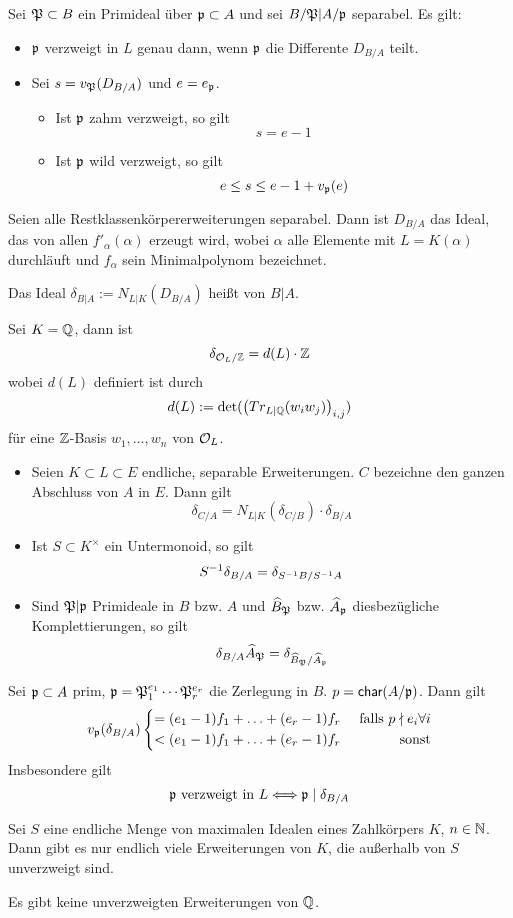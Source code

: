 \Satz{}
Sei $\mathfrak{P} \subset B$ ein Primideal über $\mathfrak{p} \subset A$ und sei $B/\mathfrak{P} | A / \mathfrak{p}$ separabel. Es gilt:
\begin{itemize}
	\item $\mathfrak{p}$ verzweigt in $L$ genau dann, wenn $\mathfrak{p}$ die Differente $D_{B/A}$ teilt.
	\item Sei $s = v_{\mathfrak{P}}(D_{B/A})$ und $e = e_{\mathfrak{p}}$.
	\begin{itemize}
		\item Ist $\mathfrak{p}$ zahm verzweigt, so gilt
		\[ s = e - 1\]
		\item Ist $\mathfrak{p}$ wild verzweigt, so gilt
		\[ e \leq s \leq e - 1 + v_{\mathfrak{p}}(e) \]
	\end{itemize}
\end{itemize}

\Satz{}
Seien alle Restklassenkörpererweiterungen separabel. Dann ist $D_{B/A}$ das Ideal, das von allen $f'_\alpha(\alpha)$ erzeugt wird, wobei $\alpha$ alle Elemente mit $L = K(\alpha)$ durchläuft und $f_\alpha$ sein Minimalpolynom bezeichnet.

Das Ideal $\delta_{B|A} := N_{L|K}(D_{B/A})$ heißt  von $B|A$.

\Satz{}
Sei $K = \mathbb{Q}$, dann ist
\[ \delta_{\mathcal{O}_L/\mathbb{Z}}  = d(L)\cdot \mathbb{Z} \]
wobei $d(L)$ definiert ist durch
\[ d(L) := \det( \left(Tr_{L|\mathbb{Q}} (w_i w_j)\right)_{i,j} ) \]
für eine $\mathbb{Z}$-Basis $w_1,\ldots, w_n$ von $\mathcal{O}_L$.

\Satz{}
\begin{itemize}
	\item Seien $K\subset L\subset E$ endliche, separable Erweiterungen. $C$ bezeichne den ganzen Abschluss von $A$ in $E$. Dann gilt
	\[ \delta_{C/A} = N_{L|K}(\delta_{C/B}) \cdot \delta_{B/A} \]
	\item Ist $S \subset K^\times$ ein Untermonoid, so gilt
	\[ S^{-1} \delta_{B/A} = \delta_{S^{-1} B / S^{-1} A} \]
	\item Sind $\mathfrak{P} |\mathfrak{p}$ Primideale in $B$ bzw. $A$ und $\widehat{B}_{\mathfrak{P}}$ bzw. $\widehat{A}_{\mathfrak{p}}$ diesbezügliche Komplettierungen, so gilt
	\[ \delta_{B/A} \widehat{A}_{\mathfrak{P}} = \delta_{\widehat{B}_{\mathfrak{P}} / \widehat{A}_{\mathfrak{p}}} \]
\end{itemize}

\Satz{}
Sei $\mathfrak{p} \subset A$ prim, $\mathfrak{p} = \mathfrak{P}_1^{e_1} \cdots \mathfrak{P}_r^{e_r}$ die Zerlegung in $B$. $p = \textsf{char}(A/\mathfrak{p})$. Dann gilt
\[ v_{\mathfrak{p}} (\delta_{B/A}) \left\lbrace
\begin{aligned}
= (e_1 - 1) f_1 + \ldots + (e_r - 1)f_r && \text{ falls } p \nmid e_i \forall i\\
<(e_1 - 1) f_1 + \ldots + (e_r - 1)f_r && \text{ sonst}
\end{aligned}
\right. \]
Insbesondere gilt
\[ \mathfrak{p} \text{ verzweigt in }L \overset{}{\Longleftrightarrow} \mathfrak{p} \mid \delta_{B/A} \]

\Satz{}
Sei $S$ eine endliche Menge von maximalen Idealen eines Zahlkörpers $K$, $n\in \mathbb{N}$.\\
Dann gibt es nur endlich viele Erweiterungen von $K$, die außerhalb von $S$ unverzweigt sind.

\Satz{}
Es gibt keine unverzweigten Erweiterungen von $\mathbb{Q}$.